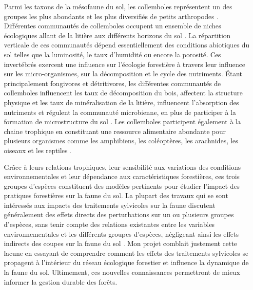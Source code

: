 Parmi les taxons de la mésofaune du sol, les collemboles représentent un des groupes les plus abondants et les plus diversifiés de petits arthropodes \citep{rusekBiodiversityCollembolaTheir1998}. 
Différentes communautés de collemboles occupent un ensemble de niches écologiques allant de la litière aux différents horizons du sol \citep{pongeVerticalDistributionCollembola2000}.
La répartition verticale de ces communautés dépend essentiellement des conditions abiotiques du sol telles que la luminosité, le taux d’humidité ou encore la porosité.
Ces invertébrés exercent une influence sur l'écologie forestière à travers leur influence sur les micro-organismes, sur la décomposition et le cycle des nutriments.
Étant principalement fongivores et détritivores, les différentes communautés de collemboles influencent les taux de décomposition du bois, affectent la structure physique et les taux de minéralisation de la litière, 
influencent l'absorption des nutriments et régulent la communauté microbienne, en plus de participer à la formation de microstructure du sol \citep{Petersen1982comparativeanalysis,Neher2012Linkinginvertebrate,Maass2015Functionalrole,Potapov2016Connectingtaxonomy}. 
Les collemboles participent également à la chaine trophique en constituant une ressource alimentaire abondante pour plusieurs organismes comme les amphibiens, les coléoptères, les arachnides, les oiseaux et les reptiles \citep{Burton1975Energyflow,Bauer1982Predationcarabid,rusekBiodiversityCollembolaTheir1998}.

Grâce à leurs relations trophiques, leur sensibilité aux variations des conditions environnementales et leur dépendance aux caractéristiques forestières, ces trois groupes d'espèces constituent des modèles pertinents pour étudier l'impact des pratiques forestières sur la faune du sol. 
La plupart des travaux qui se sont intéressés aux impacts des traitements sylvicoles sur la faune discutent généralement des effets directs des perturbations sur un ou plusieurs groupes d'espèces, 
sans tenir compte des relations existantes entre les variables environnementales et les différents groupes d'espèces, 
négligeant ainsi les effets indirects des coupes sur la faune du sol \citep{josephIntegratingOccupancyModels2016,Pollierer2021Diversityfunctional,Kudrin2023metaanalysiseffects}. 
Mon projet comblait justement cette lacune en essayant de comprendre comment les effets des traitements sylvicoles se propagent à l’intérieur du réseau écologique forestier et influence la dynamique de la faune du sol.  
Ultimement, ces nouvelles connaissances permettront de mieux informer la gestion durable des forêts.


